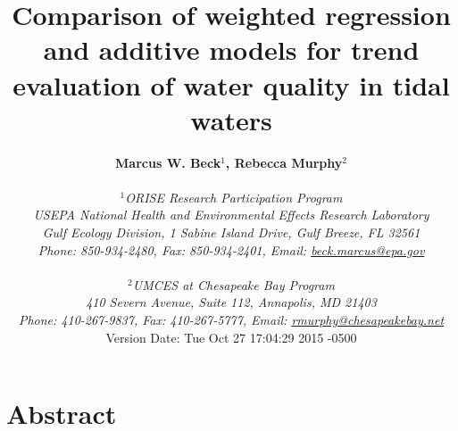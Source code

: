 \documentclass[letterpaper,12pt,oneside]{article}\usepackage[]{graphicx}\usepackage[]{color}
\begin{document}
\raggedbottom
\linenumbers
\raggedright
{}
\setlength{\parindent}{0.5in}
\renewcommand\refname{References \vspace{12pt}}

\begin{singlespace}
\title{{\bf {\Large Comparison of weighted regression and additive models for trend evaluation of water quality in tidal waters}}}
\author{
  {\bf {\normalsize Marcus W. Beck$^1$, Rebecca Murphy$^2$}}
  \\\\{\textit {\normalsize $^1$ORISE Research Participation Program}}
  \\{\textit {\normalsize USEPA National Health and Environmental Effects Research Laboratory}}
  \\{\textit {\normalsize Gulf Ecology Division, 1 Sabine Island Drive, Gulf Breeze, FL 32561}}
	\\{\textit {\normalsize Phone: 850-934-2480, Fax: 850-934-2401, Email: \href{mailto:beck.marcus@epa.gov}{beck.marcus@epa.gov}}}
  \\\\{\textit {\normalsize $^2$UMCES at Chesapeake Bay Program}}
	\\{\textit {\normalsize 410 Severn Avenue, Suite 112, Annapolis, MD 21403}}
	\\{\textit {\normalsize Phone: 410-267-9837, Fax: 410-267-5777, Email: \href{mailto:rmurphy@chesapeakbay.net}{rmurphy@chesapeakebay.net}}}
  \vspace{1in} 
  \\ Version Date:   Tue Oct 27 17:04:29 2015 -0500
	}
\date{}
\maketitle
\end{singlespace}
\clearpage

\section*{Abstract}
\end{document}
